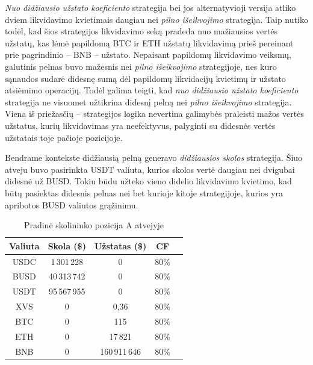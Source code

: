 \documentclass[]{VUMIFTemplateClass}
\begin{document}
\textit{Nuo didžiausio užstato koeficiento} strategija bei jos alternatyvioji versija atliko dviem likvidavimo kvietimais daugiau nei \textit{pilno išeikvojimo} strategija. Taip nutiko todėl, kad šios strategijos likvidavimo seką pradeda nuo mažiausios vertės užstatų, kas lėmė papildomą BTC ir ETH užstatų likvidavimą prieš pereinant prie pagrindinio – BNB – užstato. Nepaisant papildomų likvidavimo veiksmų, galutinis pelnas buvo mažesnis nei \textit{pilno išeikvojimo} strategijoje, nes kuro sąnaudos sudarė didesnę sumą dėl papildomų likvidacijų kvietimų ir užstato atsiėmimo operacijų. Todėl galima teigti, kad \textit{nuo didžiausio užstato koeficiento} strategija ne visuomet užtikrina didesnį pelną nei \textit{pilno išeikvojimo} strategija. Viena iš priežasčių – strategijos logika nevertina galimybės praleisti mažos vertės užstatus, kurių likvidavimas yra neefektyvus, palyginti su didesnės vertės užstatais toje pačioje pozicijoje.

Bendrame kontekste didžiausią pelną generavo \textit{didžiausios skolos} strategija. Šiuo atveju buvo pasirinkta USDT valiuta, kurios skolos vertė daugiau nei dvigubai didesnė už BUSD. Tokiu būdu užteko vieno didelio likvidavimo kvietimo, kad būtų pasiektas didesnis pelnas nei bet kurioje kitoje strategijoje, kurios yra apribotos BUSD valiutos grąžinimu.

\begin{table}[H]
\centering
\caption{Pradinė skolininko pozicija A atvejyje}
\label{case_a}
\begin{tabular}{|c|c|c|c|c|}
\hline
\textbf{Valiuta} & \textbf{Skola (\$)} & \textbf{Užstatas (\$)} & \textbf{CF} \\ \hline
USDC &  1\,301\,228  &  0             & 80\%  \\ \hline
BUSD &  40\,313\,742 &  0             & 80\%  \\ \hline
USDT &  95\,567\,955 &  0             & 80\%  \\ \hline
XVS  &  0            &  0,36          & 80\%  \\ \hline
BTC  &  0            &  115           & 80\%  \\ \hline
ETH  &  0            &  17\,821       & 80\%  \\ \hline
BNB  &  0            &  160\,911\,646 & 80\%  \\ \hline
\end{tabular}
\end{table}
\end{document}
